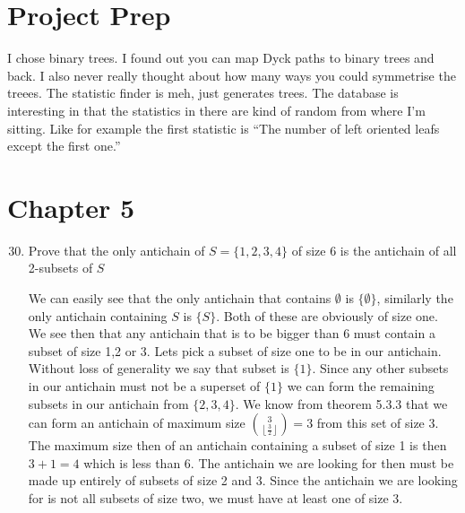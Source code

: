\documentclass{article}
\begin{document}
\section*{Project Prep}
I chose binary trees. I found out you can map Dyck paths to binary trees and back. I also never really thought about how many ways you could symmetrise the treees. The statistic finder is meh, just generates trees. The database is interesting in that the statistics in there are kind of random from where I'm sitting. Like for example the first statistic is ``The number of left oriented leafs except the first one.''
\section*{Chapter 5}
\begin{enumerate}
\setcounter{enumi}{29}\item
Prove that the only antichain of $S=\{1,2,3,4\}$ of size 6 is the antichain of all 2-subsets of $S$

We can easily see that the only antichain that contains $\emptyset$ is $\{\emptyset\}$, similarly the only antichain containing $S$ is $\{S\}$.
Both of these are obviously of size one.
We see then that any antichain that is to be bigger than 6 must contain a subset of size 1,2 or 3.
Lets pick a subset of size one to be in our antichain.
Without loss of generality we say that subset is $\{1\}$.
Since any other subsets in our antichain must not be a superset of $\{1\}$ we can form the remaining subsets in our antichain from $\{2,3,4\}$.
We know from theorem 5.3.3 that we can form an antichain of maximum size $\binom{3}{\left\lfloor \frac{3}{2}\right\rfloor}=3$ from this set of size 3.
The maximum size then of an antichain containing a subset of size 1 is then $3+1=4$ which is less than 6.
The antichain we are looking for then must be made up entirely of subsets of size 2 and 3.
Since the antichain we are looking for is not all subsets of size two, we must have at least one of size 3.


\end{enumerate}
\end{document}
